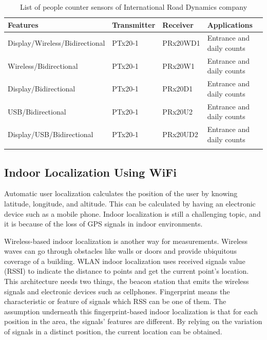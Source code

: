 \documentclass[../UNBThesis2.tex]{subfiles}
\begin{document}
\begin{table}[!h]{}
\small
\centering
\caption{List of people counter sensors of International Road Dynamics company}%
\begin{tabular}{llll}
\toprule
\textbf{Features} & \textbf{Transmitter} & \textbf{Receiver}  & \textbf{Applications}     \\
\midrule
Display/Wireless/Bidirectional     &  PTx20-1 & PRx20WD1 & Entrance and daily counts\\ 
Wireless/Bidirectional             &  PTx20-1 & PRx20W1  & Entrance and daily counts\\ 
Display/Bidirectional              &  PTx20-1 & PRx20D1  & Entrance and daily counts\\ 
USB/Bidirectional                  &  PTx20-1 & PRx20U2  & Entrance and daily counts\\ 
Display/USB/Bidirectional          &  PTx20-1 & PRx20UD2 & Entrance and daily counts\\ 
\bottomrule
\label{sensor}
\end{tabular}
\end{table}




\subsection{Indoor Localization Using WiFi}

Automatic user localization calculates the position of the user by knowing latitude, longitude, and altitude. This can be calculated by having an electronic device such as a mobile phone. Indoor localization is still a challenging topic, and it is because of the loss of GPS signals in indoor environments.

Wireless-based indoor localization is another way for measurements. Wireless waves can go through obstacles like walls or doors and provide ubiquitous coverage of a building. WLAN indoor localization uses received signals value (RSSI) to indicate the distance to points and get the current point's location.
This architecture needs two things, the beacon station that emits the wireless signals and electronic devices such as cellphones. 
Fingerprint means the characteristic or feature of signals which RSS can be one of them. The assumption underneath this fingerprint-based indoor localization is that for each position in the area, the signals' features are different. By relying on the variation of signals in a distinct position, the current location can be obtained.
\end{document}
